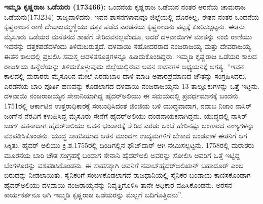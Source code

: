 \textbf{ಇಮ್ಮಡಿ ಕೃಷ್ಣರಾಜ ಒಡೆಯರು (173466): } ಒಂದನೆಯ ಕೃಷ್ಣರಾಜ ಒಡೆಯನ ನಂತರ ಆರನೆಯ ಚಾಮರಾಜ ಒಡೆಯನು(173234) ರಾಜ್ಯವಾಳಿದನು. ಇವನ ಶಾಸನಗಳಾವುವೂ ಜಿಲ್ಲೆಯಲ್ಲಿ ದೊರಕಿಲ್ಲ. ಈತನ ನಂತರ ಒಂದನೆಯ ಕೃಷ್ಣರಾಜನ ರಾಣಿ ದೇವಾಜಮ್ಮಣ್ಣಿಯು ದತ್ತಕ ಪಡೆದ ಎರಡನೆಯ ಕೃಷ್ಣರಾಜನು ಪಟ್ಟಕ್ಕೆ ಕೂರಿಸಲ್ಪಟ್ಟನು. ಈತನು ಮೈಸೂರು ಒಡೆಯರ ಮನೆತನದ ಶಾಖೆಗೆ ಸೇರಿದವನಲ್ಲವೆಂದೂ, ಆದರೆ ದಳವಾಯಿಗಳ ಮಾತನ್ನು ನಂಬಿ ರಾಣಿಯು ಇವನನ್ನು ದತ್ತಕಪಡೆದಳೆಂದು ತಿಳಿದುಬರುತ್ತದೆ. ದಳವಾಯಿ ಸಹೋದರರಾದ ನಂಜರಾಜಯ್ಯ ಮತ್ತು ದೇವರಾಜಯ್ಯ ಈತನ ಕಾಲದಲ್ಲಿ ಪ್ರಬಲಿಸಿ ಸಮಸ್ತ ಆಡಳಿತಸೂತ್ರಗಳನ್ನೂ ಹಿಡಿದುಕೊಂಡಿದ್ದರು. ಇಮ್ಮಡಿ ಕೃಷ್ಣರಾಜ ಒಡೆಯರ ಕಾಲದ ರಾಜಕೀಯ ಹಿನ್ನೆಲೆಯನ್ನು ತಿಳಿದುಕೊಳ್ಳುವುದು ಜಿಲ್ಲೆಯಲ್ಲಿರುವ ಅವನ ಶಾಸನಗಳ ಅಧ್ಯಯನಕ್ಕೆ ಅಗತ್ಯ. “ಇವನ ಕಾಲದಲ್ಲಿ ಮರಾಠರು ಮೈಸೂರಿನ ಮೇಲೆ ಎರಡುಬಾರಿ ದಾಳಿ ಮಾಡಿ ಅಪಾರಪ್ರಮಾಣದ ಚೌತನ್ನು ಸಂಗ್ರಹಿಸಿದರು. ಎರಡನೆಯ ಬಾರಿ ಪೂರ್ತಿ ಹಣವನ್ನು ಕೊಡಲಾಗದ ದಳವಾಯಿ ನಂಜರಾಜಯ್ಯನು 13 ತಾಲ್ಲೂಕುಗಳನ್ನು ಒತ್ತೆ ಇಟ್ಟನು. ದಳವಾಯಿ ನಂಜರಾಜಯ್ಯನ ಸೇನಾನಿಯಾಗಿದ್ದ ಹೈದರ್​ಅಲಿಯು ಈ ಸಮಯದಲ್ಲಿ ಪ್ರವರ್ಧಮಾನಕ್ಕೆ ಬಂದನು. 1751ರಲ್ಲಿ ಆರ್ಕಾಟಿನ ಉತ್ತರಾಧಿಕಾರಕ್ಕೆ ಸಂಬಂಧಿಸಿದಂತೆ ಜಿಂಜಿಯ ಬಳಿ ಯುದ್ಧವಾದಾಗ, ನವಾಬ ನಿಜಾಂ ನಾಸಿರ್​ಜಂಗ್​ನ ನೆರವಿಗೆ ಕಳುಹಿಸಿದ್ದ ಮೈಸೂರು ಸೇನೆಗೆ ಹೈದರ್​ಅಲಿಯು ದಂಡನಾಯಕನಾಗಿದ್ದನು. ಯುದ್ಧದಲ್ಲಿ ನಾಸಿರ್​ಜಂಗ್​ ಹತನಾದಾಗ ಹೈದರ್​ಅಲಿಯು ಅವನ ಭಂಡಾರಕ್ಕೆ ಸೇರಿದ ಎರಡು ಒಂಟೆ ಹೇರಿನಷ್ಟು ಬಂಗಾರದ ನಾಣ್ಯಗಳನ್ನು ವಶಪಡಿಸಿಕೊಂಡನು. ಯುದ್ಧ ಸಾಹಸಿಯಾದ ಆತನ ಮುಂದಣ ಉದ್ಯಮಗಳಿಗೆ ಬೇಕಾದ ಬಂಡವಾಳ ಈತನಿಗೆ ಆಗ ಸಿಕ್ಕಿತು. ಹೈದರ್​ ಅಲಿಯು ಕ್ರಿ.ಶ.1755ರಲ್ಲಿ ದಿಂಡಿಗಲ್ಲಿನ ಫೌಜ್​ದಾರ್​ ಆಗಿ ನೇಮಿಸಲ್ಪಟ್ಟನು. 1758ರಲ್ಲಿ ಮರಾಠರು ಮೂರನೆಯ ಬಾರಿ ಚೌತ ಸಂಗ್ರಹಕ್ಕೆ ಬಂದಾಗ ಸೇನಾನಿ ಹೈದರ್​ಅಲಿ ಅವರನ್ನು ಸೋಲಿಸಿ ಅವರಿಗೆ ಒತ್ತೆ ಇಟ್ಟಿದ್ದ ಬೆಂಗಳೂರನ್ನು ವಶಪಡಿಸಿಕೊಂಡನು. ಈ ಸಾಹಸಕ್ಕಾಗಿ ಅವನಿಗೆ ನವಾಬ್​ ಹೈದರ್​ಅಲಿಖಾನ್​ ಬಹಾದೂರ್​ ಎಂಬ ಬಿರುದನ್ನು ನೀಡಲಾಯಿತು. ಸೈನಿಕರಿಗೆ ಸಂಬಳಕೊಡಲಾಗದೆ ರಾಜಧಾನಿಯಲ್ಲಿ ಸೈನಿಕರ ಬಂಡಾಯ ಕಾಣಿಸಕೊಂಡಾಗ ಹೈದರ್​ಅಲಿಯು ದಳವಾಯಿ ನಂಜರಾಯ್ಯನನ್ನು ನಿವೃತ್ತಿಗೊಳಿಸಿ ತಾನೇ ಅಧಿಕಾರ ವಹಿಸಿಕೊಂಡನು. ಅರಸನ ಕಾರ್ಯಕರ್ತನೂ ಆಗಿ ಇಮ್ಮಡಿ ಕೃಷ್ಣರಾಜ ಒಡೆಯರನ್ನು ಮೆಲ್ಲಗೆ ಬದಿಗೊತ್ತಿದನು”.

